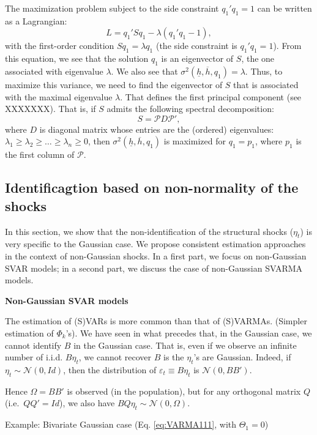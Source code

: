 \documentclass[
]{book}
\theoremstyle{definition}
\theoremstyle{definition}
\theoremstyle{definition}
\theoremstyle{definition}
\theoremstyle{remark}
\begin{document}
The maximization problem subject to the side constraint \(q_1'q_1=1\) can be written as a Lagrangian: \[
L=q_1'Sq_1-\lambda(q_1'q_1-1),
\]
with the first-order condition \(Sq_1=\lambda q_1\) (the side constraint is \(q_1'q_1=1\)). From this equation, we see that the solution \(q_1\) is an eigenvector of \(S\), the one associated with eigenvalue \(\lambda\). We also see that \(\sigma^2(\underline{h},\overline{h},q_1)=\lambda\). Thus, to maximize this variance, we need to find the eigenvector of \(S\) that is associated with the maximal eigenvalue \(\lambda\). That defines the first principal component (see XXXXXXX). That is, if \(S\) admits the following spectral decomposition:
\[
S = \mathcal{P}D\mathcal{P}',
\]
where \(D\) is diagonal matrix whose entries are the (ordered) eigenvalues: \(\lambda_1 \ge \lambda_2 \ge \dots \ge \lambda_n \ge 0\), then \(\sigma^2(\underline{h},\overline{h},q_1)\) is maximized for \(q_1 = p_1\), where \(p_1\) is the first column of \(\mathcal{P}\).

\hypertarget{NonGaussian}{%
\subsection{Identificagtion based on non-normality of the shocks}\label{NonGaussian}}

In this section, we show that the non-identification of the structural shocks (\(\eta_t\)) is very specific to the Gaussian case. We propose consistent estimation approaches in the context of non-Gaussian shocks. In a first part, we focus on non-Gaussian SVAR models; in a second part, we discuss the case of non-Gaussian SVARMA models.

\textbf{Non-Gaussian SVAR models}

The estimation of (S)VARs is more common than that of (S)VARMAs. (Simpler estimation of \(\Phi_k\)'s). We have seen in what precedes that, in the Gaussian case, we cannot identify \(B\) in the Gaussian case. That is, even if we observe an infinite number of i.i.d. \(B \eta_t\), we cannot recover \(B\) is the \(\eta_t\)'s are Gaussian. Indeed, if \(\eta_t \sim \mathcal{N}(0,Id)\), then the distribution of \(\varepsilon_t \equiv B \eta_t\) is \(\mathcal{N}(0,BB')\).

Hence \(\Omega = B B'\) is observed (in the population), but for any orthogonal matrix \(Q\) (i.e.~\(QQ'=Id\)), we also have \(BQ \eta_t \sim \mathcal{N}(0,\Omega)\).

Example: Bivariate Gaussian case (Eq. \eqref{eq:VARMA111}, with \(\Theta_1=0\))
\end{document}
